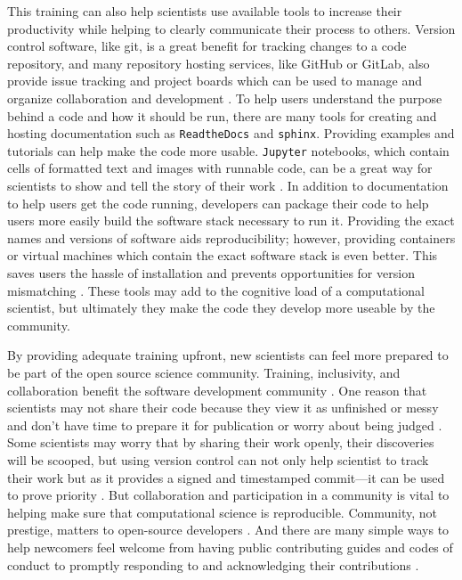 This training can also help scientists use available tools to increase their productivity while helping to clearly communicate their process to others. 
Version control software, like git, is a great benefit for tracking changes to a code repository, and many repository hosting services, like GitHub or GitLab, also provide issue tracking and project boards which can be used to manage and organize collaboration and development \cite{Gentzkow2014}.
To help users understand the purpose behind a code and how it should be run, there are many tools for creating and hosting documentation such as \texttt{ReadtheDocs} and \texttt{sphinx}.
Providing examples and tutorials can help make the code more usable.
\texttt{Jupyter} notebooks, which contain cells of formatted text and images with runnable code, can be a great way for scientists to show and tell the story of their work \cite{Rule2019a}.
In addition to documentation to help users get the code running, developers can package their code to help users more easily build the software stack necessary to run it.
Providing the exact names and versions of software aids reproducibility; however, providing containers or virtual machines which contain the exact software stack is even better. This saves users the hassle of installation and prevents opportunities for version mismatching \cite{Cito2016, Shirts2008a}.
These tools may add to the cognitive load of a computational scientist, but ultimately they make the code they develop more useable by the community.

By providing adequate training upfront, new scientists can feel more prepared to be part of the open source science community.
Training, inclusivity, and collaboration benefit the software development community \cite{Jankowski2019}.
One reason that scientists may not share their code because they view it as unfinished or messy and don't have time to prepare it for publication or worry about being judged \cite{Irving2016}.
Some scientists may worry that by sharing their work openly, their discoveries will be scooped, but using version control can not only help scientist to track their work but as it provides a signed and timestamped commit---it can be used to prove priority \cite{Blischak2016}. 
But collaboration and participation in a community is vital to helping make sure that computational science is reproducible. 
Community, not prestige, matters to open-source developers \cite{Smirnova2022}.
And there are many simple ways to help newcomers feel welcome from having public contributing guides and codes of conduct to promptly responding to and acknowledging their contributions \cite{Sholler2019}.

